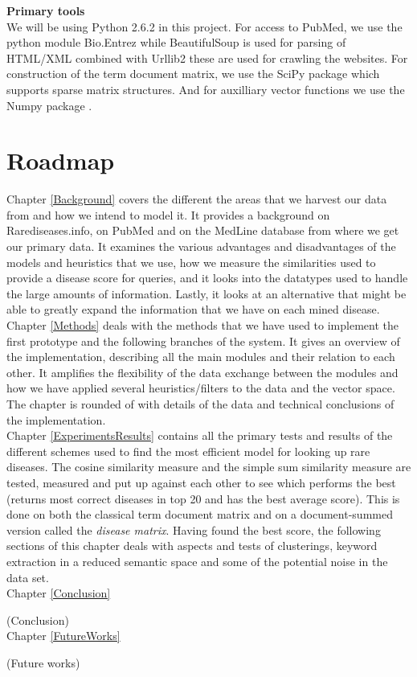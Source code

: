 \textbf{Primary tools} \\ We will be using Python 2.6.2
\cite{PythonLanguage} in this project. For access to PubMed, we use
the python module Bio.Entrez \cite{EntrezProgUtil} while BeautifulSoup
\cite{BS} is used for parsing of HTML/XML combined with Urllib2
\cite{UL2} these are used for crawling the websites. For construction
of the term document matrix, we use the SciPy package \cite{SciPy}
which supports sparse matrix structures. And for auxilliary vector
functions we use the Numpy package \cite{NumPy}.

\section{Roadmap}

Chapter \ref{Background} covers the different the areas that we harvest our
data from and how we intend to model it. It provides a background on
Rarediseases.info, on PubMed and on the MedLine database from where we
get our primary data. It examines the various advantages and
disadvantages of the models and heuristics that we use, how we measure
the similarities used to provide a disease score for queries, and it
looks into the datatypes used to handle the large amounts of
information. Lastly, it looks at an alternative that might be able to
greatly expand the information that we have on each mined disease.\\

Chapter \ref{Methods} deals with the methods that we have used to implement
the first prototype and the following branches of the system. It gives
an overview of the implementation, describing all the main modules and
their relation to each other. It amplifies the flexibility of the data
exchange between the modules and how we have applied several
heuristics/filters to the data and the vector space. The chapter is
rounded of with details of the data and technical conclusions of the
implementation.\\

Chapter \ref{ExperimentsResults} contains all the primary tests and
results of the different schemes used to find the most efficient model
for looking up rare diseases. The cosine similarity measure and the
simple sum similarity measure are tested, measured and put up against
each other to see which performs the best (returns most correct
diseases in top 20 and has the best average score). This is done on
both the classical term document matrix and on a document-summed
version called the \textit{disease matrix}. Having found the best
score, the following sections of this chapter deals with aspects and
tests of clusterings, keyword extraction in a reduced semantic space
and some of the potential noise in the data set.\\

Chapter \ref{Conclusion}

(Conclusion)\\

Chapter \ref{FutureWorks}

(Future works) \\
